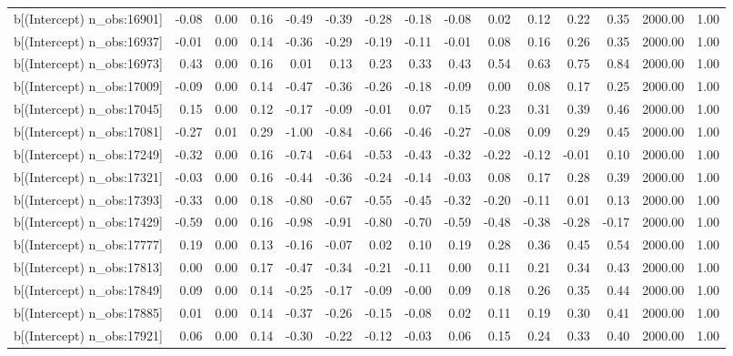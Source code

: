 \begin{table}[ht]
\begin{tabular}{rrrrrrrrrrrrrrr}
  b[(Intercept) n\_obs:16901] & -0.08 & 0.00 & 0.16 & -0.49 & -0.39 & -0.28 & -0.18 & -0.08 & 0.02 & 0.12 & 0.22 & 0.35 & 2000.00 & 1.00 \\ 
  b[(Intercept) n\_obs:16937] & -0.01 & 0.00 & 0.14 & -0.36 & -0.29 & -0.19 & -0.11 & -0.01 & 0.08 & 0.16 & 0.26 & 0.35 & 2000.00 & 1.00 \\ 
  b[(Intercept) n\_obs:16973] & 0.43 & 0.00 & 0.16 & 0.01 & 0.13 & 0.23 & 0.33 & 0.43 & 0.54 & 0.63 & 0.75 & 0.84 & 2000.00 & 1.00 \\ 
  b[(Intercept) n\_obs:17009] & -0.09 & 0.00 & 0.14 & -0.47 & -0.36 & -0.26 & -0.18 & -0.09 & 0.00 & 0.08 & 0.17 & 0.25 & 2000.00 & 1.00 \\ 
  b[(Intercept) n\_obs:17045] & 0.15 & 0.00 & 0.12 & -0.17 & -0.09 & -0.01 & 0.07 & 0.15 & 0.23 & 0.31 & 0.39 & 0.46 & 2000.00 & 1.00 \\ 
  b[(Intercept) n\_obs:17081] & -0.27 & 0.01 & 0.29 & -1.00 & -0.84 & -0.66 & -0.46 & -0.27 & -0.08 & 0.09 & 0.29 & 0.45 & 2000.00 & 1.00 \\ 
  b[(Intercept) n\_obs:17249] & -0.32 & 0.00 & 0.16 & -0.74 & -0.64 & -0.53 & -0.43 & -0.32 & -0.22 & -0.12 & -0.01 & 0.10 & 2000.00 & 1.00 \\ 
  b[(Intercept) n\_obs:17321] & -0.03 & 0.00 & 0.16 & -0.44 & -0.36 & -0.24 & -0.14 & -0.03 & 0.08 & 0.17 & 0.28 & 0.39 & 2000.00 & 1.00 \\ 
  b[(Intercept) n\_obs:17393] & -0.33 & 0.00 & 0.18 & -0.80 & -0.67 & -0.55 & -0.45 & -0.32 & -0.20 & -0.11 & 0.01 & 0.13 & 2000.00 & 1.00 \\ 
  b[(Intercept) n\_obs:17429] & -0.59 & 0.00 & 0.16 & -0.98 & -0.91 & -0.80 & -0.70 & -0.59 & -0.48 & -0.38 & -0.28 & -0.17 & 2000.00 & 1.00 \\ 
  b[(Intercept) n\_obs:17777] & 0.19 & 0.00 & 0.13 & -0.16 & -0.07 & 0.02 & 0.10 & 0.19 & 0.28 & 0.36 & 0.45 & 0.54 & 2000.00 & 1.00 \\ 
  b[(Intercept) n\_obs:17813] & 0.00 & 0.00 & 0.17 & -0.47 & -0.34 & -0.21 & -0.11 & 0.00 & 0.11 & 0.21 & 0.34 & 0.43 & 2000.00 & 1.00 \\ 
  b[(Intercept) n\_obs:17849] & 0.09 & 0.00 & 0.14 & -0.25 & -0.17 & -0.09 & -0.00 & 0.09 & 0.18 & 0.26 & 0.35 & 0.44 & 2000.00 & 1.00 \\ 
  b[(Intercept) n\_obs:17885] & 0.01 & 0.00 & 0.14 & -0.37 & -0.26 & -0.15 & -0.08 & 0.02 & 0.11 & 0.19 & 0.30 & 0.41 & 2000.00 & 1.00 \\ 
  b[(Intercept) n\_obs:17921] & 0.06 & 0.00 & 0.14 & -0.30 & -0.22 & -0.12 & -0.03 & 0.06 & 0.15 & 0.24 & 0.33 & 0.40 & 2000.00 & 1.00 \\ 

\end{tabular}
\end{table}
